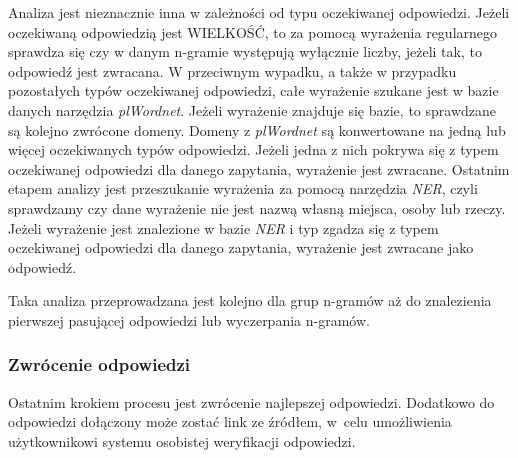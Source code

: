 Analiza jest nieznacznie inna w zależności od typu oczekiwanej odpowiedzi. Jeżeli oczekiwaną odpowiedzią jest WIELKOŚĆ, to za pomocą wyrażenia regularnego sprawdza się czy w danym n-gramie występują wyłącznie liczby, jeżeli tak, to odpowiedź jest zwracana. W przeciwnym wypadku, a także w przypadku pozostałych typów oczekiwanej odpowiedzi, całe wyrażenie szukane jest w bazie danych narzędzia \emph{plWordnet}. Jeżeli wyrażenie znajduje się bazie, to sprawdzane są kolejno zwrócone domeny. Domeny z \emph{plWordnet} są konwertowane na jedną lub więcej oczekiwanych typów odpowiedzi. Jeżeli jedna z nich pokrywa się z typem oczekiwanej odpowiedzi dla danego zapytania, wyrażenie jest zwracane. Ostatnim etapem analizy jest przeszukanie wyrażenia za pomocą narzędzia \emph{NER}, czyli sprawdzamy czy dane wyrażenie nie jest nazwą własną miejsca, osoby lub rzeczy. Jeżeli wyrażenie jest znalezione w bazie \emph{NER} i typ zgadza się z typem oczekiwanej odpowiedzi dla danego zapytania, wyrażenie jest zwracane jako odpowiedź. 

Taka analiza przeprowadzana jest kolejno dla grup n-gramów aż do znalezienia pierwszej pasującej odpowiedzi lub wyczerpania n-gramów. 

\subsubsection{Zwrócenie odpowiedzi}
Ostatnim krokiem procesu jest zwrócenie najlepszej odpowiedzi. Dodatkowo do odpowiedzi dołączony może zostać link ze źródłem, w~celu umożliwienia użytkownikowi systemu osobistej weryfikacji odpowiedzi.


